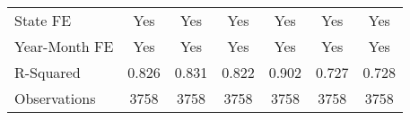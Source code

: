 {\begin{tabular}{l*{6}{c}}
\hline
State FE            &         Yes         &         Yes         &         Yes         &         Yes         &         Yes         &         Yes         \\
Year-Month FE       &         Yes         &         Yes         &         Yes         &         Yes         &         Yes         &         Yes         \\
R-Squared           &       0.826         &       0.831         &       0.822         &       0.902         &       0.727         &       0.728         \\
Observations        &        3758         &        3758         &        3758         &        3758         &        3758         &        3758         \\
\hline\hline
\end{tabular}
}

